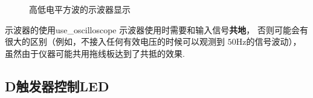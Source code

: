 \documentclass[fontset=windows,11pt]{SEU-Digital-Report}
\begin{document}
            \begin{figure}[htbp]
                \centering
                \caption{高低电平方波的示波器显示}
                \label{fig:square_wave}
            \end{figure}

            \begin{note}{示波器的使用}{use_oscilloscope}
                示波器使用时需要和输入信号\textbf{共地}，
                否则可能会有很大的区别（例如，不接入任何有效电压的时候可以观测到 $50\mathrm{Hz}$的信号波动），虽然由于仪器可能共用拖线板达到了共抵的效果.
            \end{note}

        \subsection{D触发器控制LED}
\end{document}
